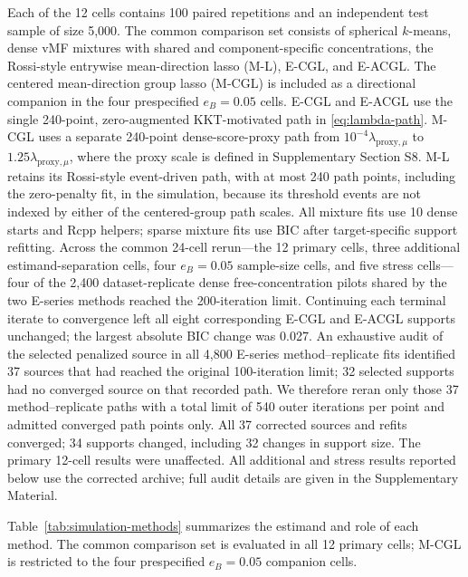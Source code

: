 \documentclass[preprint,12pt,authoryear]{elsarticle}
\begin{document}
Each of the 12 cells contains 100 paired repetitions and an independent test
sample of size 5,000. The common comparison set consists of spherical
$k$-means, dense vMF mixtures with shared and component-specific
concentrations, the Rossi-style entrywise mean-direction lasso (M-L), E-CGL,
and E-ACGL. The centered
mean-direction group lasso (M-CGL) is included as a
directional companion in the four prespecified
$e_B=0.05$ cells. E-CGL and E-ACGL use the single 240-point,
zero-augmented KKT-motivated path in \eqref{eq:lambda-path}. M-CGL uses a separate
240-point dense-score-proxy path from
$10^{-4}\lambda_{\mathrm{proxy},\mu}$ to
$1.25\lambda_{\mathrm{proxy},\mu}$, where the proxy scale is defined in
Supplementary Section S8. M-L retains its Rossi-style event-driven path, with
at most 240 path points, including the zero-penalty fit, in the simulation,
because its threshold events are not indexed by either of the centered-group
path scales.
All mixture fits use 10 dense starts and Rcpp helpers; sparse mixture fits use
BIC after target-specific support refitting.
Across the common 24-cell rerun---the 12 primary cells, three additional
estimand-separation cells, four $e_B=0.05$ sample-size cells, and five stress
cells---four of the 2,400 dataset-replicate dense
free-concentration pilots shared by the two E-series methods reached the
200-iteration limit. Continuing each terminal iterate to convergence left all eight
corresponding E-CGL and E-ACGL supports unchanged; the largest absolute BIC
change was 0.027.
An exhaustive audit of the selected penalized source in all 4,800 E-series
method--replicate fits identified 37 sources that had reached the original
100-iteration limit; 32 selected supports had no converged source on that
recorded path. We therefore reran only those 37 method--replicate paths with a
total limit of 540 outer iterations per point and admitted converged path
points only. All 37 corrected
sources and refits converged; 34 supports changed, including 32 changes in
support size. The primary 12-cell results were unaffected. All additional
and stress results reported below use the corrected archive; full audit
details are given in the Supplementary Material.

Table~\ref{tab:simulation-methods} summarizes the estimand and role of each
method. The common comparison set is evaluated in all 12 primary cells;
M-CGL is restricted to the four prespecified $e_B=0.05$ companion cells.
\end{document}
